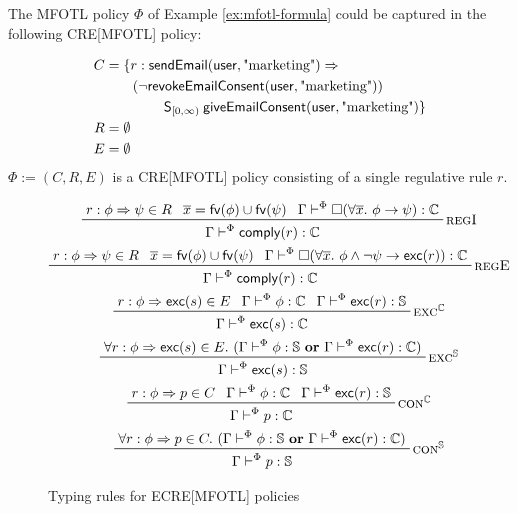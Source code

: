 \begin{example}
    \label{ex:cre-policy}
    The MFOTL policy $\Phi$ of Example \ref{ex:mfotl-formula}
    could be captured in the following CRE[MFOTL] policy:

    \begin{align*}
        C &= \{ r : \mathsf{sendEmail}(\mathsf{user}, \text{"marketing"}) \Rightarrow \\
            &\qquad (\neg
                \mathsf{revokeEmailConsent}(\mathsf{user}, \text{"marketing"})) \\
                & \qquad \qquad \mathbin{\mathsf{S}}_{[0,\infty)}
                \mathsf{giveEmailConsent}(\mathsf{user}, \text{"marketing"})
        \} \\
        R &= \emptyset \\
        E &= \emptyset
    \end{align*}
    $\Phi := (C,R,E)$ is a CRE[MFOTL] policy consisting of a single
    regulative rule $r$.
\end{example}

\begin{figure}
    \begin{gather*}
        \prftree[r]{\textsc{regI}}
            {r : \phi \Rightarrow \psi \in R}
            {\overline{x}=\fv(\phi) \cup \fv(\psi)}
            {\Gamma \vdash^\Phi \Always (\forall \overline{x}.~\phi \rightarrow \psi) : \Cau}
            {\Gamma \vdash^\Phi \comply(r) : \Cau} \\
        \prftree[r]{\textsc{regE}}
            {r : \phi \Rightarrow \psi \in R}
            {\overline{x}=\fv(\phi) \cup \fv(\psi)} 
            {\Gamma \vdash^\Phi \Always
                (\forall \overline{x}.~\phi \land \neg \psi \rightarrow \exc(r)) : \Cau}
            { \Gamma \vdash^\Phi \comply(r) : \Cau} \\
        \prftree[r]{$\textsc{exc}^\Cau$}
            {r : \phi \Rightarrow \exc(s) \in E}
            {\Gamma \vdash^\Phi \phi : \Cau}
            {\Gamma \vdash^\Phi \exc(r) : \Sup}
            {\Gamma \vdash^\Phi \exc(s) : \Cau} \\
        \prftree[r]{$\textsc{exc}^\Sup$}
            {\forall r : \phi \Rightarrow \exc(s) \in E.~
                (\Gamma \vdash^\Phi \phi : \Sup~\mathbf{or}~\Gamma \vdash^\Phi \exc(r) : \Cau)}
            {\Gamma \vdash^\Phi \exc(s) : \Sup} \\
        \prftree[r]{$\textsc{con}^\Cau$}
            {r : \phi \Rightarrow p \in C}
            {\Gamma \vdash^\Phi \phi : \Cau}
            {\Gamma \vdash^\Phi \exc(r) : \Sup}
            {\Gamma \vdash^\Phi p : \Cau} \\
        \prftree[r]{$\textsc{con}^\Sup$}
            {\forall r : \phi \Rightarrow p \in C.~
                (\Gamma \vdash^\Phi \phi : \Sup~\mathbf{or}~\Gamma \vdash^\Phi \exc(r) : \Cau)}
            {\Gamma \vdash^\Phi p : \Sup}
    \end{gather*}
    \vspace{-2em}
    \caption{Typing rules for ECRE[MFOTL] policies\label{fig:ecre-typing-rules} \cite[Figure 6]{lex}}
\end{figure}


